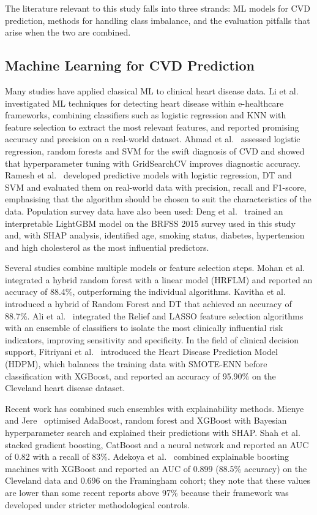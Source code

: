 \documentclass[11pt,a4paper]{article}
\begin{document}
The literature relevant to this study falls into three strands: ML models
for CVD prediction, methods for handling class imbalance, and the
evaluation pitfalls that arise when the two are combined.

\subsection{Machine Learning for CVD Prediction}

Many studies have applied classical ML to clinical heart disease data. Li et
al.~\cite{li} investigated ML techniques for detecting heart disease within
e-healthcare frameworks, combining classifiers such as logistic regression
and KNN with feature selection to extract the most relevant features, and
reported promising accuracy and precision on a real-world dataset. Ahmad et
al.~\cite{ahmad} assessed logistic regression, random forests and SVM for the
swift diagnosis of CVD and showed that hyperparameter tuning with
GridSearchCV improves diagnostic accuracy. Ramesh et al.~\cite{ramesh}
developed predictive models with logistic regression, DT and SVM and
evaluated them on real-world data with precision, recall and F1-score,
emphasising that the algorithm should be chosen to suit the characteristics
of the data. Population survey data have also been used: Deng et
al.~\cite{deng} trained an interpretable LightGBM model on the BRFSS 2015
survey used in this study and, with SHAP analysis, identified age, smoking
status, diabetes, hypertension and high cholesterol as the most influential
predictors.

Several studies combine multiple models or feature selection steps. Mohan
et al.~\cite{mohan} integrated a hybrid random forest with a linear model
(HRFLM) and reported an accuracy of 88.4\%, outperforming the individual
algorithms. Kavitha et al.~\cite{kavitha} introduced a hybrid of Random
Forest and DT that achieved an accuracy of 88.7\%. Ali et al.~\cite{ali}
integrated the Relief and LASSO feature selection algorithms with an
ensemble of classifiers to isolate the most clinically influential risk
indicators, improving sensitivity and specificity. In the field of clinical
decision support, Fitriyani et al.~\cite{fitriyani} introduced the Heart
Disease Prediction Model (HDPM), which balances the training data with
SMOTE-ENN before classification with XGBoost, and reported an accuracy of
95.90\% on the Cleveland heart disease dataset.

Recent work has combined such ensembles with explainability methods.
Mienye and Jere~\cite{mienye2024} optimised AdaBoost, random forest and
XGBoost with Bayesian hyperparameter search and explained their predictions
with SHAP. Shah et al.~\cite{shah2025} stacked gradient boosting, CatBoost
and a neural network and reported an AUC of 0.82 with a recall of 83\%.
Adekoya et al.~\cite{adekoya2025} combined explainable boosting machines
with XGBoost and reported an AUC of 0.899 (88.5\% accuracy) on the
Cleveland data and 0.696 on the Framingham cohort; they note that these
values are lower than some recent reports above 97\% because their
framework was developed under stricter methodological controls.
\end{document}
